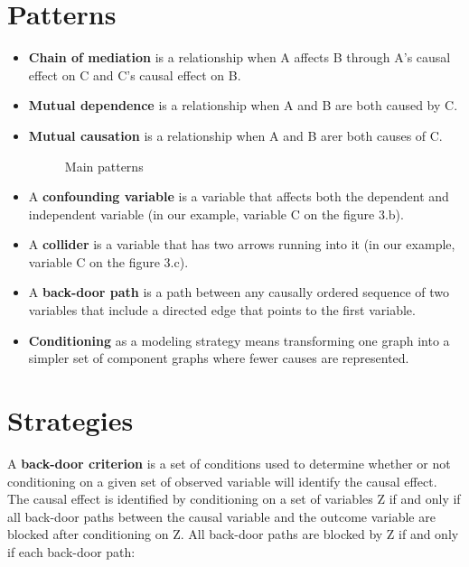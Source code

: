\section*{Patterns}

\begin{itemize}

\item \textbf{Chain of mediation} is a relationship when A affects B through A's causal effect on C and C's causal effect on B.

\item \textbf{Mutual dependence} is a relationship when A and B are both caused by C.

\item \textbf{Mutual causation} is a relationship when A and B arer both causes of C. 

\begin{figure}[htp]\centering
\caption{Main patterns}\vspace{0.3cm}
\end{figure}

\item A \textbf{confounding variable} is a variable that affects both the dependent and independent variable (in our example, variable C on the figure 3.b).

\item A \textbf{collider} is a variable that has two arrows running into it (in our example, variable C on the figure 3.c).

\item A \textbf{back-door path} is a path between any causally ordered sequence  of two variables that include a directed edge that points to the first variable. 

\item \textbf{Conditioning} as a modeling strategy means transforming one graph into a simpler set of component graphs where fewer causes are represented.

\end{itemize}

\section*{Strategies}

A \textbf{back-door criterion} is a set of conditions used to determine whether or not conditioning on a given set of observed variable will identify the causal effect. The causal effect is identified by conditioning on a set of variables Z if and only if all back-door paths between the causal variable and the outcome variable are blocked after conditioning on Z. All back-door paths are blocked by Z if and only if each back-door path:


